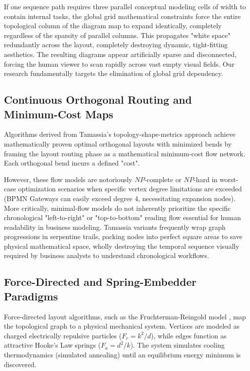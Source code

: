 \documentclass[fleqn,10pt]{wlscirep}
\begin{document}
If one sequence path requires three parallel conceptual modeling cells of width to contain internal tasks, the global grid mathematical constraints force the entire topological column of the diagram map to expand identically, completely regardless of the sparsity of parallel columns. This propagates "white space" redundantly across the layout, completely destroying dynamic, tight-fitting aesthetics. The resulting diagrams appear artificially sparse and disconnected, forcing the human viewer to scan rapidly across vast empty visual fields. Our research fundamentally targets the elimination of global grid dependency.

\subsection*{Continuous Orthogonal Routing and Minimum-Cost Maps}
Algorithms derived from Tamassia's topology-shape-metrics approach \cite{Tamassia1987} achieve mathematically proven optimal orthogonal layouts with minimized bends by framing the layout routing phase as a mathematical minimum-cost flow network. Each orthogonal bend incurs a defined "cost".

However, these flow models are notoriously $NP$-complete or $NP$-hard in worst-case optimization scenarios when specific vertex degree limitations are exceeded (BPMN Gateways can easily exceed degree 4, necessitating expansion nodes). More critically, minimal-flow models do not inherently prioritize the specific chronological "left-to-right" or "top-to-bottom" reading flow essential for human readability in business modeling. Tamassia variants frequently wrap graph progressions in serpentine trails, packing nodes into perfect square areas to save physical mathematical space, wholly destroying the temporal sequence visually required by business analysts to understand chronological workflows.

\subsection*{Force-Directed and Spring-Embedder Paradigms}
Force-directed layout algorithms, such as the Fruchterman-Reingold model \cite{Fruchterman1991}, map the topological graph to a physical mechanical system. Vertices are modeled as charged electrically repulsive particles ($F_r = k^2 / d$), while edges function as attractive Hooke's Law springs ($F_a = d^2 / k$). The system simulates cooling thermodynamics (simulated annealing) until an equilibrium energy minimum is discovered.
\end{document}
